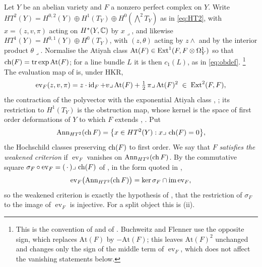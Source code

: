 \begin{setupenv}\label{setup:criterion}
Let $Y$ be an abelian variety and $F$ a nonzero perfect complex on $Y$. Write
$HT^{2}(Y)=H^{0,2}(Y)\oplus H^{1}(T_{Y})\oplus H^{0}(\bigwedge^{2}T_{Y})$ as
in \eqref{eq:HT2}, with $x=(z,v,\pi)$ acting on $H^{*}(Y,\mathbb{C})$ by
$x\lrcorner$, and likewise $HT^{1}(Y)=H^{0,1}(Y)\oplus H^{0}(T_{Y})$, with
$(z,\theta)$ acting by $z\wedge$ and by the interior product $\theta\lrcorner$.
Normalise the Atiyah class $\mathrm{At}(F)\in\operatorname{Ext}^{1}(F,F\otimes\Omega^{1}_{Y})$
so that $\operatorname{ch}(F)=\operatorname{tr}\exp\mathrm{At}(F)$; for a line bundle $L$
it is then $c_{1}(L)$, as in \eqref{eq:obdef}.%
\footnote{This is the convention of \cite{Tod09} and of
\cite[footnote 14]{Mar25a}. Buchweitz and Flenner use the opposite sign,
which replaces $\mathrm{At}(F)$ by $-\mathrm{At}(F)$; this leaves
$\mathrm{At}(F)^{2}$ unchanged and changes only the sign of the middle term
of $\operatorname{ev}_{F}$, which does not affect the vanishing statements
below.}
The evaluation map of \cite[Theorem~9.19]{paperI} is, under HKR,
\begin{equation}\label{eq:evgeneral}
  \operatorname{ev}_{F}(z,v,\pi)=z\cdot\operatorname{id}_{F}+v\lrcorner\,\mathrm{At}(F)
  +\tfrac12\,\pi\lrcorner\,\mathrm{At}(F)^{2}\;\in\;\operatorname{Ext}^{2}(F,F),
\end{equation}
the contraction of the polyvector with the exponential Atiyah class
\cite[Theorem A]{Hua21}, \cite{BF08}; its restriction to $H^{1}(T_{Y})$ is the
obstruction map, whose kernel is the space of first order deformations of $Y$
to which $F$ extends \cite{Tod09}, \cite[Section 8.3]{Mar25a}. Put
\[
  \operatorname{Ann}_{HT^{2}}(\operatorname{ch} F)=\bigl\{x\in HT^{2}(Y):x\lrcorner\,\operatorname{ch}(F)=0\bigr\},
\]
the Hochschild classes preserving $\operatorname{ch}(F)$ to first order. We say that $F$
\emph{satisfies the weakened criterion} if $\operatorname{ev}_{F}$ vanishes on
$\operatorname{Ann}_{HT^{2}}(\operatorname{ch} F)$. By the commutative square
$\sigma_{F}\circ\operatorname{ev}_{F}=(\,\cdot\,)\lrcorner\,\operatorname{ch}(F)$ of
\cite[Proposition 6.2.1 and Corollary 6.3.2]{BF08}, in the form quoted in
\cite[Lemma 11.3]{Mar25b},
\[
  \operatorname{ev}_{F}\bigl(\operatorname{Ann}_{HT^{2}}(\operatorname{ch} F)\bigr)
  =\ker\sigma_{F}\cap\operatorname{im}\operatorname{ev}_{F},
\]
so the weakened criterion is exactly the hypothesis of
\cite[Question 11.4]{Mar25b}, that the restriction of $\sigma_{F}$ to the
image of $\operatorname{ev}_{F}$ is injective. For a split object this is
(ii).
\end{setupenv}


